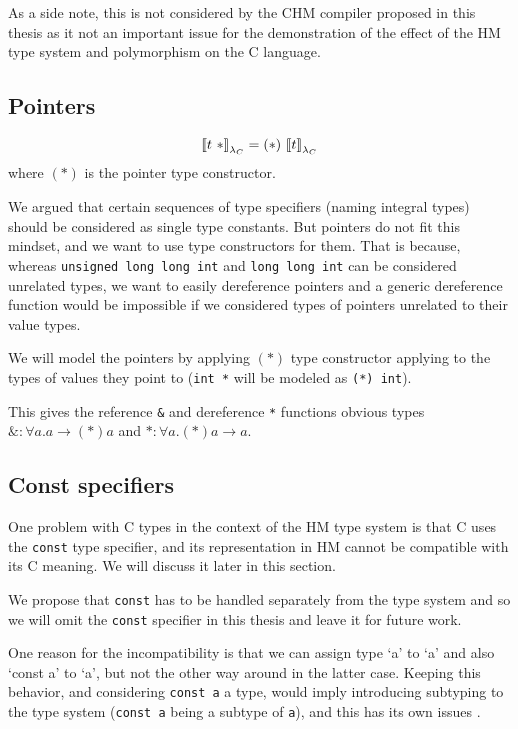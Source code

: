 As a side note, this is not considered by the CHM compiler proposed in this thesis as it not an important issue for the demonstration of the effect of the HM type system and polymorphism on the C language.

\subsection{Pointers}

\begin{defn}
    $$\lambdac{t\ *} = (*)\ \lambdac{t}$$
    where $(*)$ is the pointer type constructor.
\end{defn}

We argued that certain sequences of type specifiers (naming integral types) should be considered as single type constants. But pointers do not fit this mindset, and we want to use type constructors for them. That is because, whereas \lstinline{unsigned long long int} and \lstinline{long long int} can be considered unrelated types, we want to easily dereference pointers and a generic dereference function would be impossible if we considered types of pointers unrelated to their value types.

We will model the pointers by applying $(*)$ type constructor applying to the types of values they point to (\lstinline{int *} will be modeled as \lstinline{(*) int}).

This gives the reference \lstinline{&} and dereference \lstinline{*} functions obvious types $\&: \forall a . a \rightarrow (*) a$ and $*: \forall a . (*) a \rightarrow a$.

\subsection{Const specifiers}

One problem with C types in the context of the HM type system is that C uses the \lstinline{const} type specifier, and its representation in HM cannot be compatible with its C meaning. We will discuss it later in this section.

We propose that \lstinline{const} has to be handled separately from the type system and so we will omit the \lstinline{const} specifier in this thesis and leave it for future work.

One reason for the incompatibility is that we can assign type `a' to `a' and also `const a' to `a', but not the other way around in the latter case. Keeping this behavior, and considering \lstinline{const a} a type, would imply introducing subtyping to the type system (\lstinline{const a} being a subtype of \lstinline{a}), and this has its own issues \cite{palsberg2012overloading}.

